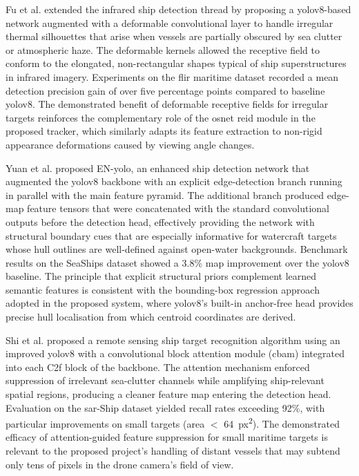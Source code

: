 \setlength{\parskip}{1em}

Fu et al.\cite{Fu2025} extended the infrared ship detection thread by proposing a \gls{yolov8}-based network augmented with a deformable convolutional layer to handle irregular thermal silhouettes that arise when vessels are partially obscured by sea clutter or atmospheric haze. The deformable kernels allowed the receptive field to conform to the elongated, non-rectangular shapes typical of ship superstructures
in infrared imagery. Experiments on the \gls{flir} maritime dataset recorded a mean detection precision gain of over five percentage points compared to baseline \gls{yolov8}. The demonstrated benefit of deformable receptive fields for irregular targets reinforces the complementary role of the \gls{osnet} \gls{reid} module in the proposed tracker, which similarly adapts its feature extraction to non-rigid appearance deformations caused by viewing angle changes.

\setlength{\parskip}{1em}

Yuan et al. \cite{Yuan2024} proposed EN-\gls{yolo}, an enhanced ship detection network
that augmented the \gls{yolov8} backbone with an explicit edge-detection branch running
in parallel with the main feature pyramid. The additional branch produced edge-map
feature tensors that were concatenated with the standard convolutional outputs
before the detection head, effectively providing the network with structural
boundary cues that are especially informative for watercraft targets whose hull
outlines are well-defined against open-water backgrounds. Benchmark results on
the SeaShips dataset showed a 3.8\% \gls{map} improvement over the \gls{yolov8} baseline.
The principle that explicit structural priors complement learned semantic features
is consistent with the bounding-box regression approach adopted in the proposed
system, where \gls{yolov8}'s built-in anchor-free head provides precise hull
localisation from which centroid coordinates are derived.
 
Shi et al. \cite{Shi2025} proposed a remote sensing ship target recognition
algorithm using an improved \gls{yolov8} with a convolutional block attention module
(\gls{cbam}) integrated into each C2f block of the backbone. The attention mechanism
enforced suppression of irrelevant sea-clutter channels while amplifying
ship-relevant spatial regions, producing a cleaner feature map entering the
detection head. Evaluation on the \gls{sar}-Ship dataset yielded recall rates exceeding
92\%, with particular improvements on small targets (area $<$ 64~px\textsuperscript{2}).
The demonstrated efficacy of attention-guided feature suppression for small
maritime targets is relevant to the proposed project's handling of distant vessels
that may subtend only tens of pixels in the drone camera's field of view.
 
